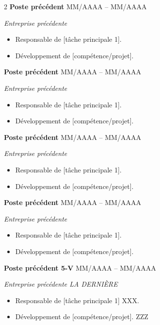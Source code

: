 \documentclass[11pt,a4paper]{article}
\begin{document}
\begin{paracol}{2}
  \vspace{10pt}
  \textbf{Poste précédent} \hfill MM/AAAA – MM/AAAA\par
  \textit{Entreprise précédente}\par
  \begin{itemize}
    \item Responsable de [tâche principale 1].
    \item Développement de [compétence/projet].
  \end{itemize}

  \vspace{10pt}
  \textbf{Poste précédent} \hfill MM/AAAA – MM/AAAA\par
  \textit{Entreprise précédente}\par
  \begin{itemize}
    \item Responsable de [tâche principale 1].
    \item Développement de [compétence/projet].
  \end{itemize}

  \vspace{10pt}
  \textbf{Poste précédent} \hfill MM/AAAA – MM/AAAA\par
  \textit{Entreprise précédente}\par
  \begin{itemize}
    \item Responsable de [tâche principale 1].
    \item Développement de [compétence/projet].
  \end{itemize}

  \vspace{10pt}
  \textbf{Poste précédent} \hfill MM/AAAA – MM/AAAA\par
  \textit{Entreprise précédente}\par
  \begin{itemize}
    \item Responsable de [tâche principale 1].
    \item Développement de [compétence/projet].
  \end{itemize}

  \vspace{10pt}
  \textbf{Poste précédent 5-V} \hfill MM/AAAA – MM/AAAA\par
  \textit{Entreprise précédente LA DERNIÈRE}\par
  \begin{itemize}
    \item Responsable de [tâche principale 1] XXX.
    \item Développement de [compétence/projet]. ZZZ
  \end{itemize}


\end{paracol}
\end{document}
